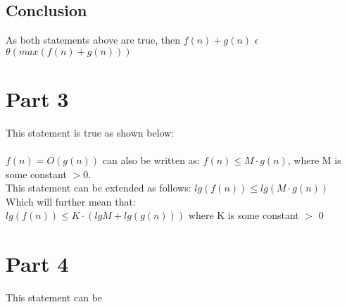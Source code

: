 \documentclass[]{article}
\begin{document}
\subsection{Conclusion}
As both statements above are true, then $ f(n) + g(n) $ $\epsilon $ $ \theta (max(f(n) + g(n)))$


\section{Part 3}
This statement is true as shown below: \\ \\
$f(n) = O(g(n))$ can also be written as: $f(n) \leq M \cdot g(n)$, where M is some constant $> 0$. \\
This statement can be extended as follows:
$lg(f(n)) \leq lg(M \cdot g(n))$ \\
Which will further mean that: \\
$ lg (f(n)) \leq K \cdot (lg M + lg(g(n)))  $  where K is some constant $>$ 0 \\



\section{Part 4}
This statement can be 
\end{document}
